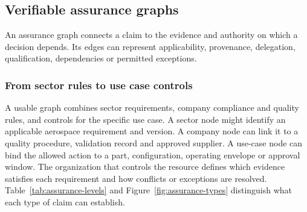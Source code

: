 \subsection{Verifiable assurance graphs}

An assurance graph connects a claim to the evidence and authority on which a decision depends. Its edges can represent applicability, provenance, delegation, qualification, dependencies or permitted exceptions.

\subsubsection{From sector rules to use case controls}

A usable graph combines sector requirements, company compliance and quality rules, and controls for the specific use case. A sector node might identify an applicable aerospace requirement and version. A company node can link it to a quality procedure, validation record and approved supplier. A use-case node can bind the allowed action to a part, configuration, operating envelope or approval window. The organization that controls the resource defines which evidence satisfies each requirement and how conflicts or exceptions are resolved.~\cite{src6,src8,src15,src16,src17} Table~\ref{tab:assurance-levels} and Figure~\ref{fig:assurance-types} distinguish what each type of claim can establish.

